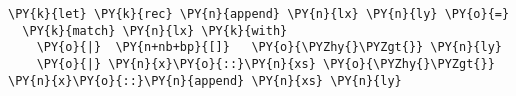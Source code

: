 \begin{Verbatim}[commandchars=\\\{\}]
\PY{k}{let} \PY{k}{rec} \PY{n}{append} \PY{n}{lx} \PY{n}{ly} \PY{o}{=}
  \PY{k}{match} \PY{n}{lx} \PY{k}{with}
    \PY{o}{|}  \PY{n+nb+bp}{[]}   \PY{o}{\PYZhy{}\PYZgt{}} \PY{n}{ly}
    \PY{o}{|} \PY{n}{x}\PY{o}{::}\PY{n}{xs} \PY{o}{\PYZhy{}\PYZgt{}} \PY{n}{x}\PY{o}{::}\PY{n}{append} \PY{n}{xs} \PY{n}{ly}
\end{Verbatim}
